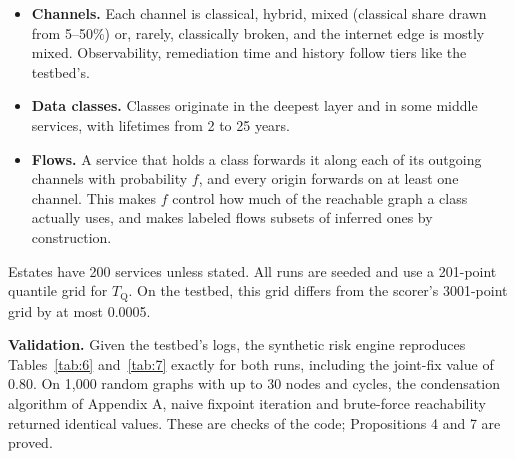 \documentclass[conference]{IEEEtran}
\newcommand{\Tq}{T_{\mathrm{Q}}}
\begin{document}
\begin{itemize}
\item \textbf{Channels.} Each channel is classical, hybrid, mixed (classical share drawn from 5–50\%) or, rarely, classically broken, and the internet edge is mostly mixed. Observability, remediation time and history follow tiers like the testbed's.
\item \textbf{Data classes.} Classes originate in the deepest layer and in some middle services, with lifetimes from 2 to 25 years.
\item \textbf{Flows.} A service that holds a class forwards it along each of its outgoing channels with probability $f$, and every origin forwards on at least one channel. This makes $f$ control how much of the reachable graph a class actually uses, and makes labeled flows subsets of inferred ones by construction.
\end{itemize}

Estates have 200 services unless stated. All runs are seeded and use a 201-point quantile grid for $\Tq$. On the testbed, this grid differs from the scorer's 3001-point grid by at most 0.0005.

\textbf{Validation.} Given the testbed's logs, the synthetic risk engine reproduces Tables~\ref{tab:6} and~\ref{tab:7} exactly for both runs, including the joint-fix value of 0.80. On 1,000 random graphs with up to 30 nodes and cycles, the condensation algorithm of Appendix A, naive fixpoint iteration and brute-force reachability returned identical values. These are checks of the code; Propositions 4 and 7 are proved.
\end{document}
